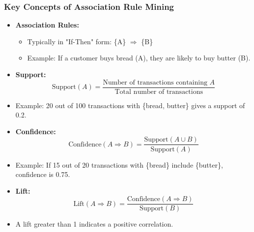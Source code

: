 \documentclass{beamer}
\begin{document}
\begin{frame}[fragile]
    \frametitle{Key Concepts of Association Rule Mining}
    \begin{itemize}
        \item \textbf{Association Rules:}
        \begin{itemize}
            \item Typically in "If-Then" form: \{A\} $\Rightarrow$ \{B\}
            \item Example: If a customer buys bread (A), they are likely to buy butter (B).
        \end{itemize}
        
        \item \textbf{Support:}
        \begin{equation}
            \text{Support}(A) = \frac{\text{Number of transactions containing } A}{\text{Total number of transactions}}
        \end{equation}
        \item Example: 20 out of 100 transactions with \{bread, butter\} gives a support of 0.2.
        
        \item \textbf{Confidence:}
        \begin{equation}
            \text{Confidence}(A \Rightarrow B) = \frac{\text{Support}(A \cup B)}{\text{Support}(A)}
        \end{equation}
        \item Example: If 15 out of 20 transactions with \{bread\} include \{butter\}, confidence is 0.75.
        
        \item \textbf{Lift:}
        \begin{equation}
            \text{Lift}(A \Rightarrow B) = \frac{\text{Confidence}(A \Rightarrow B)}{\text{Support}(B)}
        \end{equation}
        \item A lift greater than 1 indicates a positive correlation.
    \end{itemize}
\end{frame}
\end{document}

